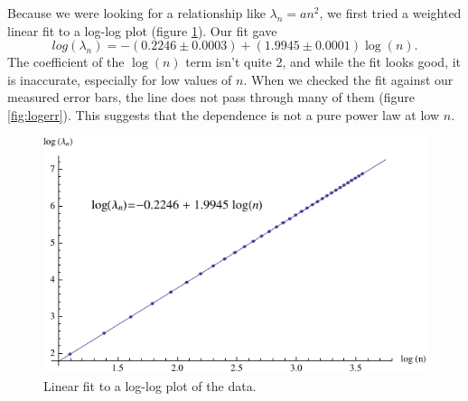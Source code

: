 \documentclass[12pt,twoside]{reedthesis}
\newcommand{\eqn}[1]{\begin{equation}#1\end{equation}}
\begin{document}
Because we were looking for a relationship like $\lambda_n = a n^2$, we first tried a weighted linear fit to a log-log plot (figure \ref{fig:loglog}). Our fit gave
\eqn{
log(\lambda_n) = -(0.2246 \pm 0.0003) + (1.9945 \pm 0.0001) \log(n)\mbox{.}
\label{eq:logfit}
} 
The coefficient of the $\log(n)$ term isn't quite 2, and while the fit looks good, it is inaccurate, especially for low values of $n$. When we checked the fit against our measured error bars, the line does not pass through many of them (figure \ref{fig:logerr}). This suggests that the dependence is not a pure power law at low $n$.
\begin{figure}[h]
\centering
\includegraphics{Figures/loglog}
\caption[Log-log fit]{Linear fit to a log-log plot of the data.}
\label{fig:loglog}
\end{figure}
\end{document}
